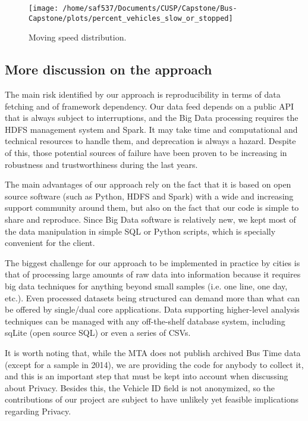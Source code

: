 \documentclass[12pt]{report}
\begin{document}
\begin{itemize}
\begin{figure}[!ht]
  \caption{Moving speed distribution.}
  \label{adh}
  \centering
    \texttt{[image: /home/saf537/Documents/CUSP/Capstone/Bus-Capstone/plots/percent\_vehicles\_slow\_or\_stopped]}
\end{figure}




\end{itemize}


\subsection{More discussion on the approach}

The main risk identified by our approach is reproducibility in terms of data fetching and of framework dependency. Our data feed depends on a public API that is always subject to interruptions, and the Big Data processing requires the HDFS management system and Spark. It may take time and computational and technical resources to handle them, and deprecation is always a hazard. Despite of this, those potential sources of failure have been proven to be increasing in robustness and trustworthiness during the last years.

The main advantages of our approach rely on the fact that it is based on open source software (such as Python, HDFS and Spark) with a wide and increasing support community around them, but also on the fact that our code is simple to share and reproduce. Since Big Data software is relatively new, we kept most of the data manipulation in simple SQL or Python scripts, which is specially convenient for the client.

The biggest challenge for our approach to be implemented in practice by cities is that of processing large amounts of raw data into information because it requires big data techniques for anything beyond small samples (i.e. one line, one day, etc.). Even processed datasets being structured can demand more than what can be offered by single/dual core applications. Data supporting higher-level analysis techniques can be managed with any off-the-shelf database system, including sqLite (open source SQL) or even a series of CSVs.

It is worth noting that, while the MTA does not publish archived Bus Time data (except for a sample in 2014), we are providing the code for anybody to collect it, and this is an important step that must be kept into account when discussing about Privacy.  Besides this, the Vehicle ID field is not anonymized, so the contributions of our project are subject to have unlikely yet feasible implications regarding Privacy.
\end{document}
